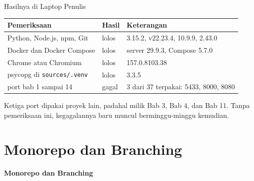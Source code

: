 \documentclass[aspectratio=169, table, 12pt]{beamer}
\begin{document}
\begin{frame}{{\Large Hasilnya di Laptop Penulis}}
  \vspace{4pt}
  \centering
  {\footnotesize
  \begin{tabularx}{\textwidth}{YlY}
    \hline
    \textbf{Pemeriksaan} & \textbf{Hasil} & \textbf{Keterangan} \\
    \hline
    Python, Node.js, npm, Git & lolos & 3.15.2, v22.23.4, 10.9.9, 2.43.0 \\
    \hline
    Docker dan Docker Compose & lolos & server 29.9.3, Compose 5.7.0 \\
    \hline
    Chrome atau Chromium & lolos & 157.0.8103.38 \\
    \hline
    psycopg di \texttt{sources/.venv} & lolos & 3.3.5 \\
    \hline
    port bab 1 sampai 14 & gagal & 3 dari 37 terpakai: 5433, 8000, 8080 \\
    \hline
  \end{tabularx}}

  \vspace{4pt}
  {\small Ketiga port dipakai proyek lain, padahal milik Bab 3, Bab 4, dan
  Bab 11. Tanpa pemeriksaan ini, kegagalannya baru muncul berminggu-minggu
  kemudian.}
\end{frame}

\section{Monorepo dan Branching}

\begin{frame}{\hfill}
  \centering
  \Huge{\textbf{Monorepo dan Branching}}
\end{frame}
\end{document}
